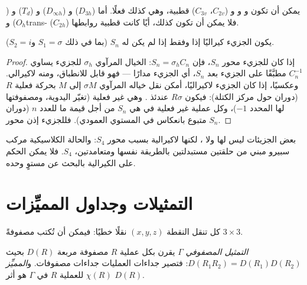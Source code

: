 \begin{example}[قطبي أم لا]\label{ex:b3:point-groups:polar}
يمكن أن تكون  و و و ($C_{2v}$، $C_{3v}$) قطبية، 
وهي كذلك فعلًا. أما  ($D_{3h}$) و ($D_{\infty h}$) و ($T_d$) و ($O_h$)
وtrans- ($C_{2h}$) فلا يمكن أن تكون كذلك، أيًا كانت قطبية روابطها.
\end{example}

\begin{theorem}\label{thm:b3:point-groups:chiral}
يكون الجزيء كيراليًا إذا وفقط إذا لم يكن له  $S_n$
(بما في ذلك $S_1 = \sigma$ و$S_2 = i$).
\end{theorem}

\begin{proof}
إذا كان للجزيء محور $S_n$، فإن $S_n = \sigma_hC_n$: الخيال المرآوي $\sigma_h$
للجزيء يساوي $C_n^{-1}$ مطبَّقًا على الجزيء بعد $S_n$، أي
الجزيء مدارًا --- فهو قابل للانطباق، ومنه لاكيرالي. وعكسيًا، إذا كان
الجزيء لاكيراليًا، أمكن نقل خياله المرآوي $\sigma M$ إلى $M$ بحركة
فعلية $R$ (دوران حول مركز الكتلة): فيكون $R\sigma$ عندئذ . وهي غير فعلية (تغيّر اليدوية، ومصفوفتها لها
المحدد $-1$)، وكل عملية غير فعلية في  هي
$S_n$ من أجل قيمة ما للعدد $n$ (دوران متبوع بانعكاس في المستوي
العمودي). فللجزيء إذن محور $S_n$.
\end{proof}

\begin{example}\label{ex:b3:point-groups:s4}
بعض الجزيئات ليس لها  ولا ، لكنها
لاكيرالية بسبب محور $S_4$: والحالة الكلاسيكية مركب سبيرو
مبني من حلقتين مستبدلتين بالطريقة نفسها ومتعامدتين،  $S_4$. فلا يمكن الحكم على الكيرالية بالبحث عن مستوٍ وحده.
\end{example}

\section{التمثيلات وجداول المميِّزات}

كل  تنقل النقطة $(x, y, z)$ نقلًا خطيًا: فيمكن أن تُكتب
مصفوفةً $3\times3$.

\begin{definition}\label{def:b3:point-groups:representation}
\emph{التمثيل المصفوفي} $\Gamma$  يقرن بكل عملية $R$ مصفوفة مربعة $D(R)$ بحيث
$D(R_1R_2) = D(R_1)D(R_2)$: فتصير جداءات العمليات جداءات
مصفوفات. و\emph{المميِّز} $\chi(R)$ للعملية $R$ في $\Gamma$ هو
أثر $D(R)$.
\end{definition}

